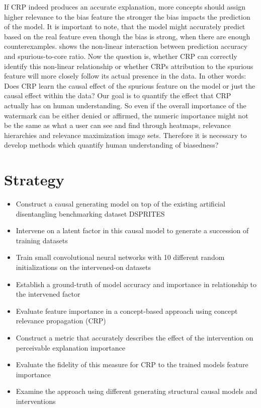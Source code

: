 If CRP indeed produces an accurate explanation, more concepts should assign higher relevance to the bias feature the stronger the bias impacts the prediction of the model. It is important to note, that the model might accurately predict based on the real feature even though the bias is strong, when there are enough counterexamples.  shows the non-linear interaction between prediction accuracy and spurious-to-core ratio.
Now the question is, whether CRP can correctly identify this non-linear relationship or whether CRPs attribution to the spurious feature will more closely follow its actual presence in the data. 
In other words: Does CRP learn the causal effect of the spurious feature on the model or just the causal effect within the data? Our goal is to quantify the effect that CRP actually has on human understanding. So even if the overall importance of the watermark can be either denied or affirmed, the numeric importance might not be the same as what a user can see and find through heatmaps, relevance hierarchies and relevance maximization image sets. Therefore it is necessary to develop methods which quantify human understanding of biasedness?  

\section{Strategy}
\begin{itemize}
    \item Construct a causal generating model on top of the existing artificial disentangling benchmarking dataset DSPRITES
    \item Intervene on a latent factor in this causal model to generate a succession of training datasets
    \item Train small convolutional neural networks with 10 different random initializations on the intervened-on datasets
    \item Establish a ground-truth of model accuracy and importance in relationship to the intervened factor
    \item Evaluate feature importance in a concept-based approach using concept relevance propagation (CRP)
    \item Construct a metric that accurately describes the effect of the intervention on perceivable explanation importance 
    \item Evaluate the fidelity of this measure for CRP to the trained models feature importance
    \item Examine the approach using different generating structural causal models and interventions
\end{itemize}

